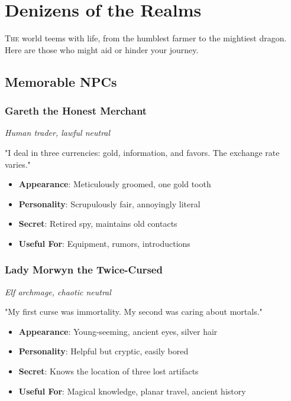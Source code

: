 \documentclass[11pt,letterpaper,openany]{book}
\begin{document}
\chapter{Denizens of the Realms}

\lettrine[lines=3]{T}{he} world teems with life, from the humblest farmer to the mightiest dragon. Here are those who might aid or hinder your journey.

\section{Memorable NPCs}

\subsection{Gareth the Honest Merchant}
\textit{Human trader, lawful neutral}

"I deal in three currencies: gold, information, and favors. The exchange rate varies."

\begin{itemize}
    \item \textbf{Appearance}: Meticulously groomed, one gold tooth
    \item \textbf{Personality}: Scrupulously fair, annoyingly literal
    \item \textbf{Secret}: Retired spy, maintains old contacts
    \item \textbf{Useful For}: Equipment, rumors, introductions
\end{itemize}

\subsection{Lady Morwyn the Twice-Cursed}
\textit{Elf archmage, chaotic neutral}

"My first curse was immortality. My second was caring about mortals."

\begin{itemize}
    \item \textbf{Appearance}: Young-seeming, ancient eyes, silver hair
    \item \textbf{Personality}: Helpful but cryptic, easily bored
    \item \textbf{Secret}: Knows the location of three lost artifacts
    \item \textbf{Useful For}: Magical knowledge, planar travel, ancient history
\end{itemize}
\end{document}
